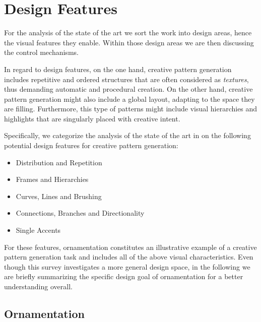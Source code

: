 
\section{Design Features}
\label{sec:design}

For the analysis of the state of the art we sort the work into design areas, hence the visual features they enable. Within those design areas we are then discussing the control mechanisms.

In regard to design features, on the one hand, creative pattern generation includes repetitive and ordered structures that are often considered as \textit{textures}, thus demanding automatic and procedural creation. On the other hand, creative pattern generation might also include a global layout, adapting to the space they are filling. Furthermore, this type of patterns might include visual hierarchies and highlights that are singularly placed with creative intent. 

Specifically, we categorize the analysis of the state of the art in  on the following potential design features for creative pattern generation:


\begin{itemize}
    \item Distribution and Repetition
    \item Frames and Hierarchies
    \item Curves, Lines and Brushing
    \item Connections, Branches and Directionality
    \item Single Accents
\end{itemize}

For these features, ornamentation constitutes an illustrative example of a creative pattern generation task and includes all of the above visual characteristics. Even though this survey investigates a more general design space, in the following we are briefly summarizing the specific design goal of ornamentation for a better understanding overall. 

\subsection{Ornamentation}
\label{subsubsec:ornamentation}

